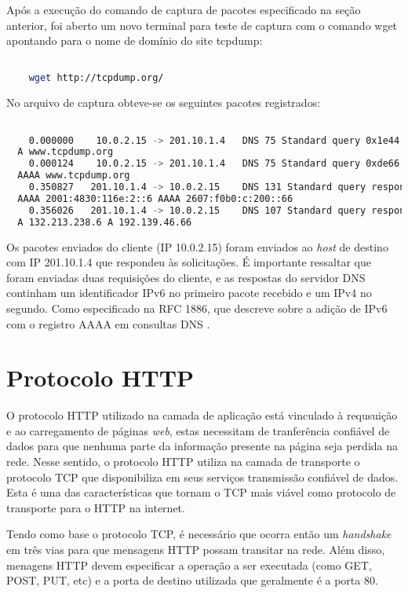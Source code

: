 \documentclass[a4paper]{report} %
\begin{document}
Após a execução do comando de captura de pacotes especificado na seção anterior, foi aberto um novo terminal para teste de captura com o comando wget apontando para o nome de domínio do site tcpdump:
\begin{lstlisting}[language=bash]

	wget http://tcpdump.org/

\end{lstlisting}

	No arquivo de captura obteve-se os seguintes pacotes registrados:

\begin{lstlisting}[language=bash]

	0.000000    10.0.2.15 -> 201.10.1.4   DNS 75 Standard query 0x1e44
  A www.tcpdump.org
	0.000124    10.0.2.15 -> 201.10.1.4   DNS 75 Standard query 0xde66
  AAAA www.tcpdump.org
	0.350827   201.10.1.4 -> 10.0.2.15    DNS 131 Standard query response 0xde66
  AAAA 2001:4830:116e:2::6 AAAA 2607:f0b0:c:200::66
	0.356026   201.10.1.4 -> 10.0.2.15    DNS 107 Standard query response 0x1e44
  A 132.213.238.6 A 192.139.46.66

\end{lstlisting}

	Os pacotes enviados do cliente (IP 10.0.2.15) foram enviados ao \textit{host} de destino com IP 201.10.1.4 que respondeu às solicitações. É importante ressaltar que foram enviadas duas requisições do cliente, e as respostas do servidor DNS continham um identificador IPv6 no primeiro pacote recebido e um IPv4 no segundo. Como especificado na RFC 1886, que descreve sobre a adição de IPv6 com o registro AAAA em consultas DNS \cite{IETF}.

\section{Protocolo HTTP}
\label{sec_http}
O protocolo HTTP utilizado na camada de aplicação está vinculado à requsuição e ao carregamento de páginas \textit{web}, estas necessitam de tranferência confiável de dados para que nenhuma parte da informação presente na página seja perdida na rede. Nesse sentido, o protocolo HTTP utiliza na camada de transporte o protocolo TCP que disponibiliza em seus serviços transmissão confiável de dados. Esta é uma das características que tornam o TCP mais viável como protocolo de transporte para o HTTP na internet. 

	Tendo como base o protocolo TCP, é necessário que ocorra então um \textit{handshake} em três vias para que mensagens HTTP possam transitar na rede. Além disso, menagens HTTP devem especificar a operação a ser executada (como GET, POST, PUT, etc) e a porta de destino utilizada que geralmente é a porta 80. 
\end{document}
